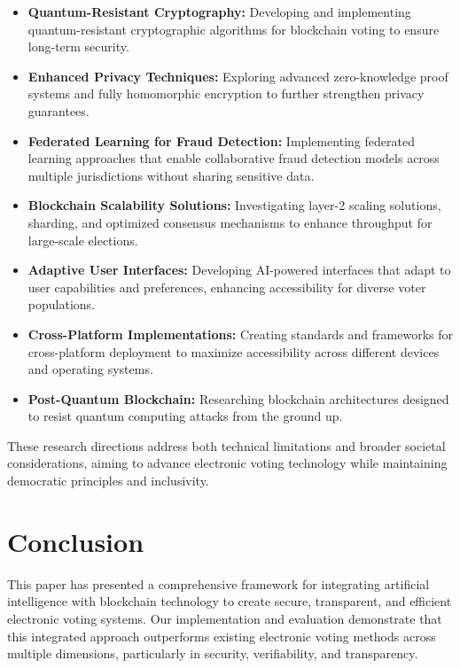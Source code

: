 \documentclass[conference]{IEEEtran}
\begin{document}
\begin{itemize}
    \item \textbf{Quantum-Resistant Cryptography:} Developing and implementing quantum-resistant cryptographic algorithms for blockchain voting to ensure long-term security.
    
    \item \textbf{Enhanced Privacy Techniques:} Exploring advanced zero-knowledge proof systems and fully homomorphic encryption to further strengthen privacy guarantees.
    
    \item \textbf{Federated Learning for Fraud Detection:} Implementing federated learning approaches that enable collaborative fraud detection models across multiple jurisdictions without sharing sensitive data.
    
    \item \textbf{Blockchain Scalability Solutions:} Investigating layer-2 scaling solutions, sharding, and optimized consensus mechanisms to enhance throughput for large-scale elections.
    
    \item \textbf{Adaptive User Interfaces:} Developing AI-powered interfaces that adapt to user capabilities and preferences, enhancing accessibility for diverse voter populations.
    
    \item \textbf{Cross-Platform Implementations:} Creating standards and frameworks for cross-platform deployment to maximize accessibility across different devices and operating systems.
    
    \item \textbf{Post-Quantum Blockchain:} Researching blockchain architectures designed to resist quantum computing attacks from the ground up.
\end{itemize}

These research directions address both technical limitations and broader societal considerations, aiming to advance electronic voting technology while maintaining democratic principles and inclusivity.

\section{Conclusion}
This paper has presented a comprehensive framework for integrating artificial intelligence with blockchain technology to create secure, transparent, and efficient electronic voting systems. Our implementation and evaluation demonstrate that this integrated approach outperforms existing electronic voting methods across multiple dimensions, particularly in security, verifiability, and transparency.
\end{document}
